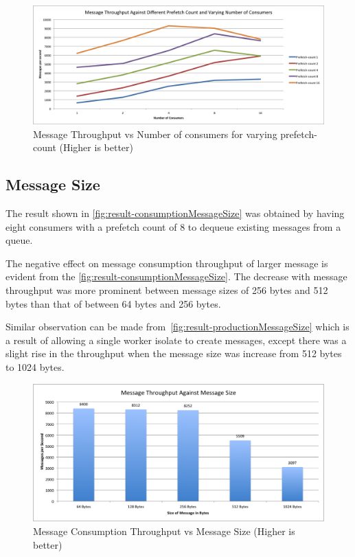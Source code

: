 \begin{figure}[H]
  \centering
  \includegraphics[width=1\textwidth]{figures/01prefetch}
  \caption[Message Throughput vs Number of consumers for varying prefetch-count]{Message Throughput vs Number of consumers for varying prefetch-count (Higher is better)}
  \label{fig:result-prefetch}
\end{figure}

\subsection{Message Size}
\label{subsec:messageSize}
The result shown in \autoref{fig:result-consumptionMessageSize} was obtained by having eight consumers with a prefetch count of 8 to dequeue existing messages from a queue.

  The negative effect on message consumption throughput of larger message is evident from the  \autoref{fig:result-consumptionMessageSize}. The decrease with message throughput was more prominent between message sizes of 256 bytes and 512 bytes than that of between 64 bytes and 256 bytes.

  Similar observation can be made from~\autoref{fig:result-productionMessageSize} which is a result of allowing a single worker isolate to create messages, except there was a slight rise in the throughput when the message size was increase from 512 bytes to 1024 bytes.

\begin{figure}[H]
  \centering  \includegraphics[width=1\textwidth]{figures/02consumptionMessageSize}
  \caption[Message Consumption Throughput vs Message Size]{Message Consumption Throughput vs Message Size (Higher is better)}
  \label{fig:result-consumptionMessageSize}
\end{figure}

